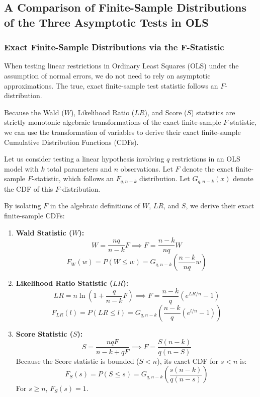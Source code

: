 \documentclass[
  letterpaper,
  DIV=11,
  numbers=noendperiod]{scrreprt}
\renewcommand{\[}{\begin{equation}}
\renewcommand{\]}{\end{equation}}
\theoremstyle{definition}
\theoremstyle{plain}
\theoremstyle{plain}
\theoremstyle{plain}
\theoremstyle{definition}
\theoremstyle{plain}
\theoremstyle{remark}
\begin{document}
\subsection{A Comparison of Finite-Sample Distributions of the Three
Asymptotic Tests in
OLS}\label{a-comparison-of-finite-sample-distributions-of-the-three-asymptotic-tests-in-ols}

\subsubsection{Exact Finite-Sample Distributions via the
F-Statistic}\label{exact-finite-sample-distributions-via-the-f-statistic}

When testing linear restrictions in Ordinary Least Squares (OLS) under
the assumption of normal errors, we do not need to rely on asymptotic
approximations. The true, exact finite-sample test statistic follows an
\(F\)-distribution.

Because the Wald (\(W\)), Likelihood Ratio (\(LR\)), and Score (\(S\))
statistics are strictly monotonic algebraic transformations of the exact
finite-sample \(F\)-statistic, we can use the transformation of
variables to derive their exact finite-sample Cumulative Distribution
Functions (CDFs).

Let us consider testing a linear hypothesis involving \(q\) restrictions
in an OLS model with \(k\) total parameters and \(n\) observations. Let
\(F\) denote the exact finite-sample \(F\)-statistic, which follows an
\(F_{q, n-k}\) distribution. Let \(G_{q, n-k}(x)\) denote the CDF of
this \(F\)-distribution.

By isolating \(F\) in the algebraic definitions of \(W\), \(LR\), and
\(S\), we derive their exact finite-sample CDFs:

\begin{enumerate}
\def\labelenumi{\arabic{enumi}.}
\item
  \textbf{Wald Statistic (\(W\)):}
  \[W = \frac{nq}{n-k} F \implies F = \frac{n-k}{nq} W\]
  \[F_W(w) = P(W \le w) = G_{q, n-k}\left( \frac{n-k}{nq} w \right)\]
\item
  \textbf{Likelihood Ratio Statistic (\(LR\)):}
  \[LR = n \ln \left( 1 + \frac{q}{n-k} F \right) \implies F = \frac{n-k}{q} (e^{LR/n} - 1)\]
  \[F_{LR}(l) = P(LR \le l) = G_{q, n-k}\left( \frac{n-k}{q} (e^{l/n} - 1) \right)\]
\item
  \textbf{Score Statistic (\(S\)):}
  \[S = \frac{n q F}{n-k + q F} \implies F = \frac{S(n-k)}{q(n - S)}\]
  Because the Score statistic is bounded (\(S < n\)), its exact CDF for
  \(s < n\) is:
  \[F_S(s) = P(S \le s) = G_{q, n-k}\left( \frac{s(n-k)}{q(n - s)} \right)\]
  For \(s \ge n\), \(F_S(s) = 1\).
\end{enumerate}
\end{document}
